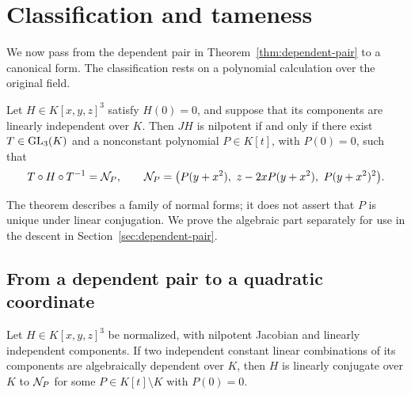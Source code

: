 \section{Classification and tameness}\label{sec:classification}

We now pass from the dependent pair in Theorem~\ref{thm:dependent-pair} to a canonical form. The classification rests on a polynomial calculation over the original field.

\begin{theorem}[Classification]\label{thm:classification}
Let $H\in K[x,y,z]^3$ satisfy $H(0)=0$, and suppose that its components are linearly independent over $K$. Then $JH$ is nilpotent if and only if there exist $T\in\operatorname{GL}_3(K)$ and a nonconstant polynomial $P\in K[t]$, with $P(0)=0$, such that
\begin{equation}\label{eq:canonical}
 T\circ H\circ T^{-1}=\mathcal N_P,
 \qquad
 \mathcal N_P=\bigl(P(y+x^2),\ z-2xP(y+x^2),\ P(y+x^2)^2\bigr).
\end{equation}
\end{theorem}

The theorem describes a family of normal forms; it does not assert that $P$ is unique under linear conjugation. We prove the algebraic part separately for use in the descent in Section~\ref{sec:dependent-pair}.

\subsection{From a dependent pair to a quadratic coordinate}
\begin{proposition}\label{prop:pair-normal}
Let $H\in K[x,y,z]^3$ be normalized, with nilpotent Jacobian and linearly independent components. If two independent constant linear combinations of its components are algebraically dependent over $K$, then $H$ is linearly conjugate over $K$ to $\mathcal N_P$ for some $P\in K[t]\setminus K$ with $P(0)=0$.
\end{proposition}

